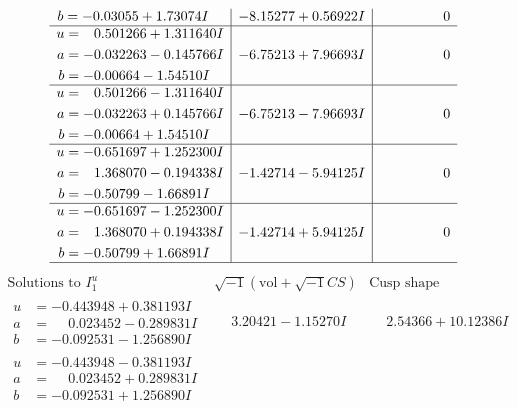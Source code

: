 \documentclass[1p]{elsarticle_modified}
\theoremstyle{definition}
\newcommand{\I}{\sqrt{-1}}
\begin{document}
$$\begin{array}{c|c|c}
\begin{aligned}
b &= -0.03055 + 1.73074 I\end{aligned}
 & -8.15277 + 0.56922 I & \phantom{-0.000000 } 0 \\ \hline\begin{aligned}
u &= \phantom{-}0.501266 + 1.311640 I \\
a &= -0.032263 - 0.145766 I \\
b &= -0.00664 - 1.54510 I\end{aligned}
 & -6.75213 + 7.96693 I & \phantom{-0.000000 } 0 \\ \hline\begin{aligned}
u &= \phantom{-}0.501266 - 1.311640 I \\
a &= -0.032263 + 0.145766 I \\
b &= -0.00664 + 1.54510 I\end{aligned}
 & -6.75213 - 7.96693 I & \phantom{-0.000000 } 0 \\ \hline\begin{aligned}
u &= -0.651697 + 1.252300 I \\
a &= \phantom{-}1.368070 - 0.194338 I \\
b &= -0.50799 - 1.66891 I\end{aligned}
 & -1.42714 - 5.94125 I & \phantom{-0.000000 } 0 \\ \hline\begin{aligned}
u &= -0.651697 - 1.252300 I \\
a &= \phantom{-}1.368070 + 0.194338 I \\
b &= -0.50799 + 1.66891 I\end{aligned}
 & -1.42714 + 5.94125 I & \phantom{-0.000000 } 0\\
 \hline 
 \end{array}$$\newpage$$\begin{array}{c|c|c}  
\text{Solutions to }I^u_{1}& \I (\text{vol} + \sqrt{-1}CS) & \text{Cusp shape}\\
 \hline 
\begin{aligned}
u &= -0.443948 + 0.381193 I \\
a &= \phantom{-}0.023452 - 0.289831 I \\
b &= -0.092531 - 1.256890 I\end{aligned}
 & \phantom{-}3.20421 - 1.15270 I & \phantom{-}2.54366 + 10.12386 I \\ \hline\begin{aligned}
u &= -0.443948 - 0.381193 I \\
a &= \phantom{-}0.023452 + 0.289831 I \\
b &= -0.092531 + 1.256890 I\end{aligned}

\end{array}$$
\end{document}
